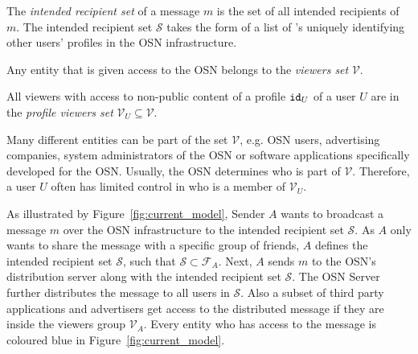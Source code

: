 \begin{defn}
\label{def:intended_recipient_set}
 The \textit{intended recipient set} of a message $m$ is the set of all intended recipients of $m$. The intended recipient set $\mathcal{S}$ takes the form of a list of \id{}'s uniquely identifying other users' profiles in the OSN infrastructure.
\end{defn}

\begin{defn}
\label{def:viewer}
 Any entity that is given access to the OSN belongs to the \textit{viewers set} $\mathcal{V}$.
\end{defn}

\begin{defn}
\label{def:viewer}
 All viewers with access to non-public content of a profile $\mathtt{id}_{U}$ of a user $U$ are in the \textit{profile viewers set} $\mathcal{V}_U \subseteq \mathcal{V}$.
\end{defn}

Many different entities can be part of the set $\mathcal{V}$, e.g. OSN users, advertising companies, system administrators of the OSN or software applications specifically developed for the OSN. Usually, the OSN determines who is part of $\mathcal{V}$. Therefore, a user $U$ often has limited control in who is a member of $\mathcal{V}_U$.

As illustrated by Figure~\ref{fig:current_model}, Sender $A$ wants to broadcast a message $m$ over the OSN infrastructure to the intended recipient set $\mathcal{S}$. As $A$ only wants to share the message with a specific group of friends, $A$ defines the intended recipient set $\mathcal{S}$, such that $\mathcal{S} \subset \mathcal{F}_A$. Next, $A$ sends $m$ to the OSN's distribution server along with the intended recipient set $\mathcal{S}$. The OSN Server further distributes the message to all users in $\mathcal{S}$. Also a subset of third party applications and advertisers get access to the distributed message if they are inside the viewers group $\mathcal{V}_A$. Every entity who has access to the message is coloured blue in Figure~\ref{fig:current_model}.

